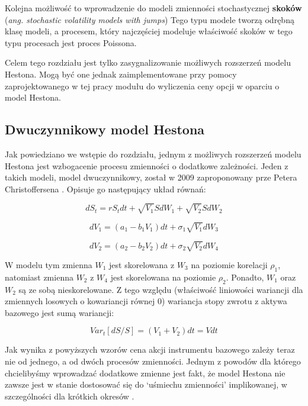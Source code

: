 \documentclass{pracamgr}
\begin{document}
Kolejna możliwość to wprowadzenie do modeli zmienności stochastycznej \textbf{skoków} (\textit{ang. stochastic volatility models with jumps})
Tego typu modele tworzą odrębną klasę modeli, a procesem, który najczęściej modeluje właściwość
skoków w tego typu procesach jest proces Poissona.

Celem tego rozdziału jest tylko zasygnalizowanie możliwych rozszerzeń modelu Hestona.
Mogą być one jednak zaimplementowane przy pomocy zaprojektowanego w tej pracy modułu 
do wyliczenia ceny opcji w oparciu o model Hestona. 

\subsection{Dwuczynnikowy model Hestona} %
\label{sec:modelDwuczynnikowy}
Jak powiedziano we wstępie do rozdziału, jednym z możliwych rozszerzeń modelu Hestona jest wzbogacenie
procesu zmienności o dodatkowe zależności. 
Jeden z takich modeli, model dwuczynnikowy, został w 2009 zaproponowany prze
Petera Christoffersena   \cite{Christoffersen}.
Opisuje go następujący układ równań:

\begin{equation}
dS_t  = r S_t dt + \sqrt{V_1} S dW_1 + \sqrt{V_2} S dW_2
\end{equation} 

\begin{equation}
dV_1  = (a_1 - b_1 V_1)dt + \sigma_1 \sqrt{V_1} dW_3 
\end{equation}

\begin{equation}
dV_2  = (a_2 - b_2 V_2)dt + \sigma_2 \sqrt{V_2} dW_4 
\end{equation}

W modelu tym zmienna $W_1$ jest skorelowana z $W_3$ na poziomie korelacji $\rho_1$, natomiast
zmienna $W_2$ z $W_4$ jest skorelowana na poziomie $\rho_2$. Ponadto, $W_1$ oraz $W_2$ są ze sobą nieskorelowane. Z tego względu (właściwość
liniowości wariancji dla zmiennych losowych o kowariancji równej $0$) wariancja stopy zwrotu z aktywa
bazowego jest sumą wariancji:

\begin{equation}
  Var_t[dS/S] = (V_1 + V_2)dt = Vdt
\end{equation}

Jak wynika z powyższych wzorów cena akcji instrumentu bazowego zależy teraz nie od jednego, a od 
dwóch procesów zmienności.
Jednym z powodów dla którego chcielibyśmy wprowadzać dodatkowe zmienne jest fakt, że model
Hestona nie zawsze jest w stanie dostosować się do `uśmiechu zmienności'  implikowanej, w szczególności dla krótkich okresów  \cite{HestonExtensions}.
\end{document}
